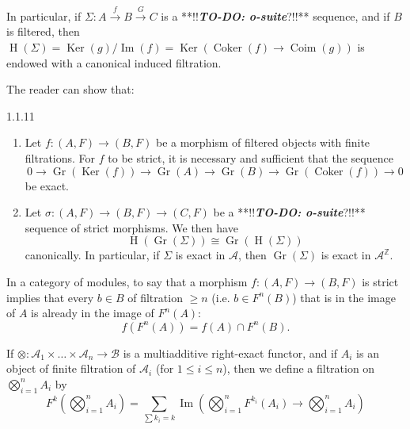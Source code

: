     In particular, if \(\Sigma \colon  A\xrightarrow {f}B\xrightarrow {G}C\) is a **!!\textbf{\emph{TO-DO: o-suite}}?!!** sequence, and if \(B\) is filtered, then \(\operatorname {H}(\Sigma )=\operatorname {Ker}(g)/\operatorname {Im}(f)=\operatorname {Ker}(\operatorname {Coker}(f)\to \operatorname {Coim}(g))\) is endowed with a canonical induced filtration.\par{}The reader can show that:\begin{proposition}{1.1.11}\label{hodge-theory-ii-1.1.11}\skipsinglepar\begin{enumerate}
    
 \item[(i)]
      Let \(f\colon (A,F)\to (B,F)\) be a morphism of filtered objects with finite filtrations.
      For \(f\) to be strict, it is necessary and sufficient that the sequence
      \[         0         \to  \operatorname {Gr}(\operatorname {Ker}(f))         \to  \operatorname {Gr}(A)         \to  \operatorname {Gr}(B)         \to  \operatorname {Gr}(\operatorname {Coker}(f))         \to  0       \]
      be exact.
    


    
 \item[(ii)]
      Let \(\sigma \colon (A,F)\to (B,F)\to (C,F)\) be a **!!\textbf{\emph{TO-DO: o-suite}}?!!** sequence of strict morphisms.
      We then have
      \[         \operatorname {H}(\operatorname {Gr}(\Sigma ))         \cong  \operatorname {Gr}(\operatorname {H}(\Sigma ))       \]
      canonically.
      In particular, if \(\Sigma \) is exact in \(\mathscr {A}\), then \(\operatorname {Gr}(\Sigma )\) is exact in \(\mathscr {A}^\mathbb {Z}\).
    

  \end{enumerate}\end{proposition}\par{}In a category of modules, to say that a morphism \(f\colon (A,F)\to (B,F)\) is strict implies that every \(b\in  B\) of filtration \(\geqslant  n\) (i.e. \(b\in  F^n(B)\)) that is in the image of \(A\) is already in the image of \(F^n(A)\):
  \[     f(F^n(A))     = f(A)\cap  F^n(B).   \]\label{hodge-theory-ii-1.1.12}\par{}If \(\otimes \colon \mathscr {A}_1\times \ldots \times \mathscr {A}_n\to \mathscr {B}\) is a multiadditive right-exact functor, and if \(A_i\) is an object of finite filtration of \(\mathscr {A}_i\) (for \(1\leqslant  i\leqslant  n\)), then we define a filtration on \(\bigotimes _{i=1}^n A_i\) by
    \[       F^k(\bigotimes _{i=1}^n A_i)       = \sum _{\sum  k_i=k} \operatorname {Im}(\bigotimes _{i=1}^n F^{k_i}(A_i)\to \bigotimes _{i=1}^n A_i)     \]
